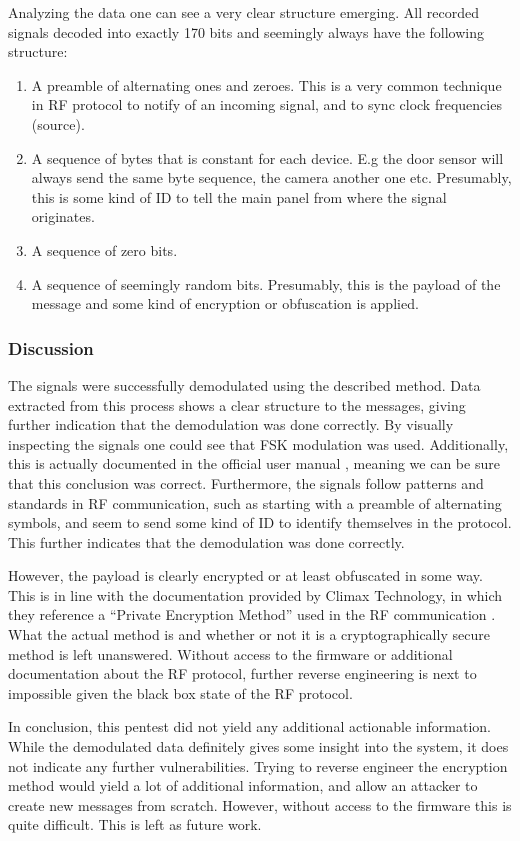 Analyzing the data one can see a very clear structure emerging. All recorded signals decoded into exactly 170 bits and seemingly always have the following structure:
\begin{enumerate}
    \item A preamble of alternating ones and zeroes. This is a very common technique in RF protocol to notify of an incoming signal, and to sync clock frequencies (\todo source).
    \item A sequence of bytes that is constant for each device. E.g the door sensor will always send the same byte sequence, the camera another one etc. Presumably, this is some kind of ID to tell the main panel from where the signal originates.
    \item A sequence of zero bits.
    \item A sequence of seemingly random bits. Presumably, this is the payload of the message and some kind of encryption or obfuscation is applied.
\end{enumerate}

\subsubsection{Discussion}
The signals were successfully demodulated using the described method. Data extracted from this process shows a clear structure to the messages, giving further indication that the demodulation was done correctly. By visually inspecting the signals one could see that FSK modulation was used. Additionally, this is actually documented in the official user manual \cite{hsgw-user-manual}, meaning we can be sure that this conclusion was correct. Furthermore, the signals follow patterns and standards in RF communication, such as starting with a preamble of alternating symbols, and seem to send some kind of ID to identify themselves in the protocol. This further indicates that the demodulation was done correctly.

However, the payload is clearly encrypted or at least obfuscated in some way. This is in line with the documentation provided by Climax Technology, in which they reference a \enquote{Private Encryption Method} used in the RF communication \cite{hsgw-user-manual}. What the actual method is and whether or not it is a cryptographically secure method is left unanswered. Without access to the firmware or additional documentation about the RF protocol, further reverse engineering is next to impossible given the black box state of the RF protocol.

In conclusion, this pentest did not yield any additional actionable information. While the demodulated data definitely gives some insight into the system, it does not indicate any further vulnerabilities. Trying to reverse engineer the encryption method would yield a lot of additional information, and allow an attacker to create new messages from scratch. However, without access to the firmware this is quite difficult. This is left as future work.
